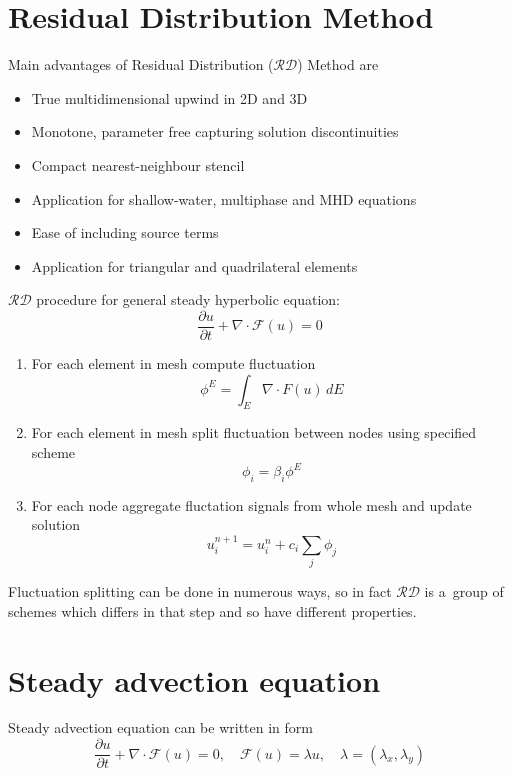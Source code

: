 \documentclass[plainboxedsections, 17pt, b1]{sciposter}
\newcommand{\fracpd}[2]{\frac{\partial #1}{\partial #2}}
\newcommand{\rd}{$\mathcal{RD}$}
\begin{document}
\begin{multicols}{3}

\section{Residual Distribution Method}
	Main advantages of Residual Distribution (\rd{}) Method are
	\begin{itemize}
		\item True multidimensional upwind in 2D and 3D
		\item Monotone, parameter free capturing solution discontinuities
		\item Compact nearest-neighbour stencil 
		\item Application for shallow-water, multiphase and MHD equations
		\item Ease of including source terms
		\item Application for triangular and quadrilateral elements
	\end{itemize}
\vspace{.3cm}

	\rd{} procedure for general steady hyperbolic equation:
	\[ \fracpd{u}{t} + \nabla \cdot \mathcal{F}(u) = 0 \]
	\begin{enumerate}
		\item For each element in mesh compute fluctuation
			\[ \phi^E = \int_E \nabla \cdot F(u) \, d E \]
		\item For each element in mesh split fluctuation between nodes using specified scheme
			\[ \phi_i = \beta_i \phi^E \]
		\item For each node aggregate fluctation signals from whole mesh and update solution
			\[ u_i^{n+1} = u_i^n + c_i \sum_j \phi_j 	\]
	\end{enumerate}
Fluctuation splitting can be done in numerous ways, so in fact \rd{} is a~group of schemes which differs in that step and so have different properties.

\section{Steady advection equation}
	Steady advection equation can be written in form
		\[ \fracpd{u}{t} + \nabla \cdot \mathcal{F}(u) = 0 , \quad \mathcal{F}(u) = \lambda u, \quad \lambda = ( \lambda_x , \lambda_y ) \]
	

\end{multicols}
\end{document}

